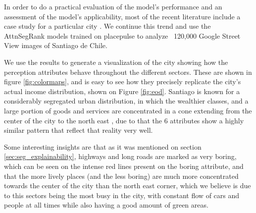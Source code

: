 In order to do a practical evaluation of the model's performance and an assessment
of the model's applicability, most of the recent literature include a case study
for  a particular city \cite{rossetti, zhang_measuring, zhang_uncovering, quercia_aesthetic,tamara_judgments,liu_machine}.
We continue this trend and use the AttnSegRank models trained on placepulse
to analyze ~120,000 Google Street View images of Santiago de Chile.

We use the results to generate a visualization of the city showing how the perception
attributes behave throughout the different sectors. These are shown in figure
\ref{fig:colormaps}, and is easy to see how they precisely replicate the city's actual
income distribution, shown on Figure \ref{fig:eod}. Santiago is known for a considerably
segregated urban distribution, in which the wealthier classes, and a large portion
of goods and services are concentrated in a cone extending from the center of the city
to the north east \cite{sabatini_segregacion}, due to that the 6 attributes show a
highly similar pattern that reflect that reality very well.

Some interesting insights are that as it was mentioned on section \ref{sec:seg_explainability},
highways and long roads are marked as very boring, which can be seen on the intense
red lines present on the boring attribute, and that the more lively places (and the less boring)
are much more concentrated towards the center of the city than the north east corner, which
we believe is due to this sectors being the most busy in the city, with constant flow
of cars and people at all times while also having a good amount of green areas.

